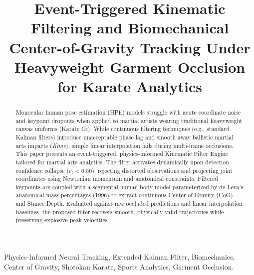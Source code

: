 \documentclass[conference]{IEEEtran}
\begin{document}
\title{Event-Triggered Kinematic Filtering and Biomechanical Center-of-Gravity Tracking Under Heavyweight Garment Occlusion for Karate Analytics}

\author{
}

\maketitle

\begin{abstract}
Monocular human pose estimation (HPE) models struggle with acute coordinate noise and keypoint dropouts when applied to martial artists wearing traditional heavyweight canvas uniforms (Karate Gi). While continuous filtering techniques (e.g., standard Kalman filters) introduce unacceptable phase lag and smooth away ballistic martial arts impacts (\textit{Kime}), simple linear interpolation fails during multi-frame occlusions. This paper presents an event-triggered, physics-informed Kinematic Filter Engine tailored for martial arts analytics. The filter activates dynamically upon detection confidence collapse ($c_t < 0.50$), rejecting distorted observations and projecting joint coordinates using Newtonian momentum and anatomical constraints. Filtered keypoints are coupled with a segmental human body model parameterized by de Leva's anatomical mass percentages (1996) to extract continuous Center of Gravity (CoG) and Stance Depth. Evaluated against raw occluded predictions and linear interpolation baselines, the proposed filter recovers smooth, physically valid trajectories while preserving explosive peak velocities.
\end{abstract}

\begin{IEEEkeywords}
Physics-Informed Neural Tracking, Extended Kalman Filter, Biomechanics, Center of Gravity, Shotokan Karate, Sports Analytics, Garment Occlusion.
\end{IEEEkeywords}








\end{document}
